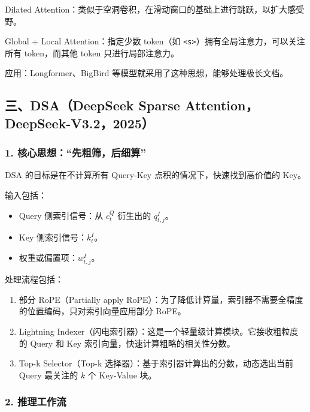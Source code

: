 Dilated Attention：类似于空洞卷积，在滑动窗口的基础上进行跳跃，以扩大感受野。

Global + Local Attention：指定少数 token（如 \texttt{\textless{}s\textgreater{}}）拥有全局注意力，可以关注所有 token，而其他 token 只进行局部注意力。

应用：Longformer、BigBird 等模型就采用了这种思想，能够处理极长文档。

\hypertarget{ux4e09dsadeepseek-sparse-attentiondeepseek-v3.22025}{%
\subsection{三、DSA（DeepSeek Sparse Attention，DeepSeek-V3.2，2025）}\label{ux4e09dsadeepseek-sparse-attentiondeepseek-v3.22025}}

\hypertarget{ux6838ux5fc3ux601dux60f3ux5148ux7c97ux7b5bux540eux7ec6ux7b97}{%
\subsubsection{1. 核心思想：``先粗筛，后细算''}\label{ux6838ux5fc3ux601dux60f3ux5148ux7c97ux7b5bux540eux7ec6ux7b97}}

DSA 的目标是在不计算所有 Query-Key 点积的情况下，快速找到高价值的 Key。

输入包括：

\begin{itemize}
\tightlist
\item
  Query 侧索引信号：从 \(c_t^Q\) 衍生出的 \(q^I_{t,j}\)。
\item
  Key 侧索引信号：\(k_t^I\)。
\item
  权重或偏置项：\(w^I_{t,j}\)。
\end{itemize}

处理流程包括：

\begin{enumerate}
\def\labelenumi{\arabic{enumi}.}
\tightlist
\item
  部分 RoPE（Partially apply RoPE）：为了降低计算量，索引器不需要全精度的位置编码，只对索引向量应用部分 RoPE。
\item
  Lightning Indexer（闪电索引器）：这是一个轻量级计算模块。它接收粗粒度的 Query 和 Key 索引向量，快速计算粗略的相关性分数。
\item
  Top-k Selector（Top-k 选择器）：基于索引器计算出的分数，动态选出当前 Query 最关注的 \(k\) 个 Key-Value 块。
\end{enumerate}

\hypertarget{ux63a8ux7406ux5de5ux4f5cux6d41}{%
\subsubsection{2. 推理工作流}\label{ux63a8ux7406ux5de5ux4f5cux6d41}}

